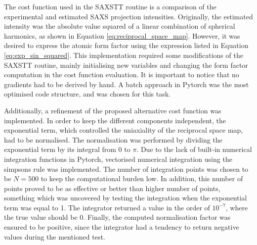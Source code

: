 The cost function used in the SAXSTT routine is a comparison of the experimental and estimated SAXS projection intensities.
Originally, the estimated intensity was the absolute value squared of a linear combination of spherical harmonics, as shown in Equation \eqref{eq:reciprocal_space_map}.
However, it was desired to express the atomic form factor using the expression listed in Equation \eqref{eq:exp_sin_squared}.
This implementation required some modifications of the SAXSTT routine, mainly initialising new variables and changing the form factor computation in the cost function evaluation.
It is important to notice that no gradients had to be derived by hand.
A batch approach in Pytorch was the most optimised code structure, and was chosen for this task.

Additionally, a refinement of the proposed alternative cost function was implemented.
In order to keep the different components independent, the exponential term, which controlled the uniaxiality of the reciprocal space map, had to be normalised.
The normalisation was performed by dividing the exponential term by its integral from $0$ to $\pi$.
Due to the lack of built-in numerical integration functions in Pytorch,
vectorised numerical integration using the simpsons rule was implemented.
The number of integration points was chosen to be $N = 500$ to keep the computational burden low.
In addition, this number of points proved to be as effective or better than higher number of points,
something which was uncovered by testing the integration when the exponential term was equal to 1.
The integrator returned a value in the order of $10^{-7}$, where the true value should be 0.
Finally, the computed normalisation factor was ensured to be positive, since the integrator had a tendency to return negative values during the mentioned test.


